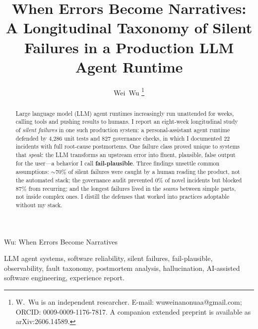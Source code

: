 \documentclass[10pt,journal]{IEEEtran}
\begin{document}
\title{When Errors Become Narratives: A Longitudinal Taxonomy of Silent
Failures in a Production LLM Agent Runtime}

\author{Wei~Wu%
\thanks{W.~Wu is an independent researcher.
E-mail: wuweinanonuaa@gmail.com; ORCID: 0009-0009-1176-7817.
A companion extended preprint is available as arXiv:2606.14589.}}

%
{Wu: When Errors Become Narratives}

\maketitle

\begin{abstract}
Large language model (LLM) agent runtimes increasingly run unattended for
weeks, calling tools and pushing results to humans. I report an eight-week
longitudinal study of \emph{silent failures} in one such production system:
a personal-assistant agent runtime defended by 4{,}286 unit tests and 827
governance checks, in which I documented 22 incidents with full root-cause
postmortems. One failure class proved unique to systems that \emph{speak}:
the LLM transforms an upstream error into fluent, plausible, false output
for the user---a behavior I call \textbf{fail-plausible}.
Three findings unsettle common assumptions: $\sim$70\% of silent failures
were caught by a human reading the product, not the automated stack; the
governance audit prevented 0\% of novel incidents but blocked 87\% from
recurring; and the longest failures lived in the \emph{seams} between simple
parts, not inside complex ones. I distill the defenses that worked into
practices adoptable without my stack.
\end{abstract}

\begin{IEEEkeywords}
LLM agent systems, software reliability, silent failures, fail-plausible,
observability, fault taxonomy, postmortem analysis, hallucination,
AI-assisted software engineering, experience report.
\end{IEEEkeywords}

\IEEEpeerreviewmaketitle
\end{document}
